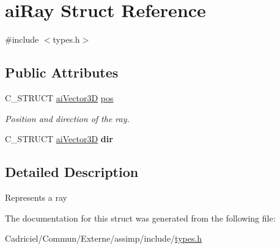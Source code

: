 \hypertarget{structai_ray}{}\section{ai\+Ray Struct Reference}
\label{structai_ray}


{\ttfamily \#include $<$types.\+h$>$}

\subsection*{Public Attributes}
\begin{DoxyCompactItemize}
\item 
C\+\_\+\+S\+T\+R\+U\+CT \hyperlink{structai_vector3_d}{ai\+Vector3D} \hyperlink{structai_ray_a312f663a7d2580b1b3beb52ffd4ab4c9}{pos}\hypertarget{structai_ray_a312f663a7d2580b1b3beb52ffd4ab4c9}{}\label{structai_ray_a312f663a7d2580b1b3beb52ffd4ab4c9}

\begin{DoxyCompactList}\small\item\em Position and direction of the ray. \end{DoxyCompactList}\item 
C\+\_\+\+S\+T\+R\+U\+CT \hyperlink{structai_vector3_d}{ai\+Vector3D} {\bfseries dir}\hypertarget{structai_ray_a635d9120af2654716e5e7952d837282b}{}\label{structai_ray_a635d9120af2654716e5e7952d837282b}

\end{DoxyCompactItemize}


\subsection{Detailed Description}
Represents a ray 

The documentation for this struct was generated from the following file\+:\begin{DoxyCompactItemize}
\item 
Cadriciel/\+Commun/\+Externe/assimp/include/\hyperlink{types_8h}{types.\+h}\end{DoxyCompactItemize}
